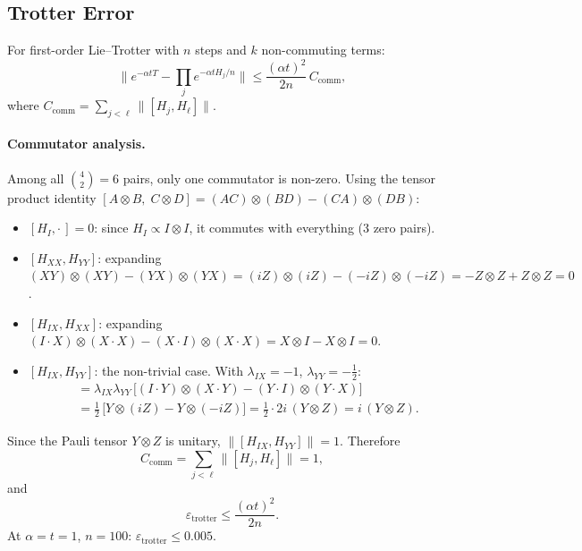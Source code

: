 \documentclass[11pt]{article}
\newcommand{\norm}[1]{\|{#1}\|}
\newcommand{\eps}{\varepsilon}
\begin{document}
\subsection{Trotter Error}
For first-order Lie--Trotter with $n$ steps and $k$ non-commuting terms:
\begin{equation}\label{eq:trotter-bnd}
\norm{e^{-\alpha t T}-\prod_{j}e^{-\alpha t H_j/n}}
\leq \frac{(\alpha t)^2}{2n}\,C_{\mathrm{comm}},
\end{equation}
where $C_{\mathrm{comm}} = \sum_{j<\ell}\norm{[H_j, H_\ell]}$.

\paragraph{Commutator analysis.}
Among all $\binom{4}{2}=6$ pairs, only one commutator is non-zero.
Using the tensor product identity
$[A\otimes B,\; C\otimes D] = (AC)\otimes(BD) - (CA)\otimes(DB)$:

\begin{itemize}
\item $[H_I, \cdot\,] = 0$: since $H_I \propto I\otimes I$, it commutes with everything
  (3 zero pairs).

\item $[H_{XX}, H_{YY}]$: expanding
  $(XY)\otimes(XY) - (YX)\otimes(YX) = (iZ)\otimes(iZ) - (-iZ)\otimes(-iZ)
  = -Z\otimes Z + Z\otimes Z = 0$.

\item $[H_{IX}, H_{XX}]$: expanding
  $(I\cdot X)\otimes(X\cdot X) - (X\cdot I)\otimes(X\cdot X)
  = X\otimes I - X\otimes I = 0$.

\item $[H_{IX}, H_{YY}]$: the non-trivial case. With $\lambda_{IX}=-1$, $\lambda_{YY}=-\tfrac{1}{2}$:
\begin{align}
[H_{IX}, H_{YY}]
&= \lambda_{IX}\lambda_{YY}\,\big[(I\cdot Y)\otimes(X\cdot Y)
    - (Y\cdot I)\otimes(Y\cdot X)\big] \nonumber\\
&= \tfrac{1}{2}\,\big[Y\otimes(iZ) - Y\otimes(-iZ)\big]
 = \tfrac{1}{2}\cdot 2i\,(Y\otimes Z)
 = i\,(Y\otimes Z). \label{eq:comm}
\end{align}
\end{itemize}

Since the Pauli tensor $Y\otimes Z$ is unitary, $\norm{[H_{IX},H_{YY}]} = 1$.
Therefore
\begin{equation}
C_{\mathrm{comm}} = \sum_{j<\ell}\norm{[H_j, H_\ell]} = 1,
\end{equation}
and
\begin{equation}\label{eq:trotter-final}
\eps_{\mathrm{trotter}} \leq \frac{(\alpha t)^2}{2n}.
\end{equation}
At $\alpha=t=1$, $n=100$: $\eps_{\mathrm{trotter}} \leq 0.005$.
\end{document}
